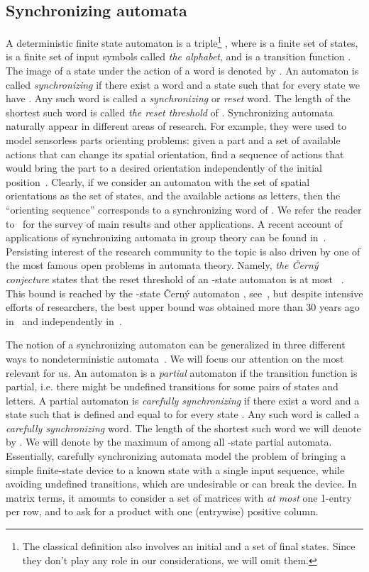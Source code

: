 \documentclass[a4paper,USenglish]{lipics}
\theoremstyle{definition}
\begin{document}
\subsection{Synchronizing automata}
A deterministic finite state automaton  is a triple\footnote{The classical definition also involves an initial and a set of final states. Since they don't play any role in our considerations, we will omit them.} , where  is a finite set of states,  is a finite set of input symbols called \emph{the alphabet}, and  is a transition function . The image of a state  under the action of a word  is denoted by . An automaton  is called \emph{synchronizing} if there exist a word  and a state  such that for every state  we have . Any such word is called a \emph{synchronizing} or \emph{reset} word. The length of the shortest such word is called \emph{the reset threshold}  of . Synchronizing automata naturally appear in different areas of research. For example, they were used to model sensorless parts orienting problems: given a part and a set of available actions that can change its spatial orientation, find a sequence of actions that would bring the part to a desired orientation independently of the initial position~\cite{Na1986}. Clearly, if we consider an automaton  with the set of spatial orientations as the set of states, and the available actions as letters, then the ``orienting sequence'' corresponds to a synchronizing word of . We refer the reader to~\cite{Volkov2008Survey} for the survey of main results and other applications. A recent account of applications of synchronizing automata in group theory can be found in~\cite{ArCaSt15}. Persisting interest of the research community to the topic is also driven by one of the most famous open problems in automata theory. Namely, \emph{the \v{C}ern\'{y} conjecture} states that the reset threshold of an -state automaton is at most ~\cite{Cerny1964,CernyPirickaRosenauerova1971}. This bound is reached by the -state \v{C}ern\'{y} automaton , see~\cite[p. 18]{Volkov2008Survey}, but despite intensive efforts of researchers, the best upper bound  was obtained more than 30 years ago in~\cite{Pin1983OnTwoCombinatorialProblems, Fr1982} and independently in~\cite{KRS1987}.

The notion of a synchronizing automaton can be generalized in three different ways to nondeterministic automata~\cite{ImSt99}. We will focus our attention on the most relevant for us. An automaton  is a \emph{partial} automaton if the transition function  is partial, i.e. there might be undefined transitions for some pairs of states and letters. A partial automaton is \emph{carefully synchronizing} if there exist a word  and a state  such that  is defined and equal to  for every state . Any such word is called a \emph{carefully synchronizing} word. The length of the shortest such word we will denote by .
We will denote by  the maximum of  among all -state partial automata. Essentially, carefully synchronizing automata model the problem of bringing a simple finite-state device to a known state with a single input sequence, while avoiding undefined transitions, which are undesirable or can break the device. In matrix terms, it amounts to consider a set of matrices with \emph{at most} one 1-entry per row, and to ask for a product with one (entrywise) positive column.
\end{document}
